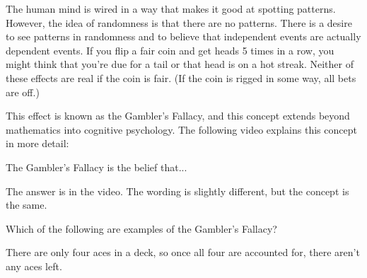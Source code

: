 \documentclass{ximera}
\begin{document}
The human mind is wired in a way that makes it good at spotting patterns. However, the idea of randomness is that there are no patterns. There is a desire to see patterns in randomness and to believe that independent events are actually dependent events. If you flip a fair coin and get heads 5 times in a row, you might think that you're due for a tail or that head is on a hot streak. Neither of these effects are real if the coin is fair. (If the coin is rigged in some way, all bets are off.)

This effect is known as the Gambler's Fallacy, and this concept extends beyond mathematics into cognitive psychology. The following video explains this concept in more detail: 



\begin{question}
The Gambler's Fallacy is the belief that...

    \begin{multipleChoice}
      \end{multipleChoice}
    \begin{hint}
    The answer is in the video. The wording is slightly different, but the concept is the same.
    \end{hint}

\end{question}

\begin{question}
Which of the following are examples of the Gambler's Fallacy?

    \begin{multipleChoice}
      \end{multipleChoice}
    \begin{hint}
    There are only four aces in a deck, so once all four are accounted for, there aren't any aces left.
    \end{hint}

\end{question}
\end{document}
